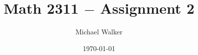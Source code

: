\documentclass[11pt]{article}
\author{Michael Walker}
\title{Math 2311 $-$ Assignment 2}
\date{\today}
\begin{document}
\maketitle
\pagebreak

\tableofcontents
\pagebreak












\end{document}
